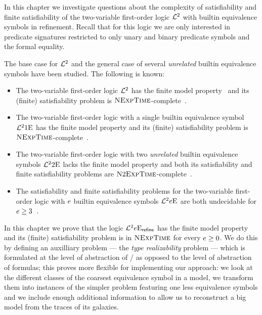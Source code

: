In this chapter we investigate questions about the complexity of satisfiability
and finite satisfiability of the two-variable first-order logic $\mathcal{L}^{2}$ with
builtin equivalence symbols in refinement. Recall that for this logic we are
only interested in predicate signatures restricted to only unary and binary
predicate symbols and the formal equality.

The base case for $\mathcal{L}^{2}$ and the general case of several \emph{unrelated}
builtin equivalence symbols have been studied. The following is known:
\begin{itemize}
  \item The two-variable first-order logic $\mathcal{L}^{2}$ has the finite model
  property~\cite{MALQ:MALQ19750210118} and its (finite) satisfiability problem
  is $\text{\normalfont{\scshape NExpTime}}$-complete~\cite{gradel1997decision}.
  \item The two-variable first-order logic with a single builtin equivalence
  symbol $\mathcal{L}^{2}{1}\mathrm{E}_{{}}$ has the finite model property and its (finite)
  satisfiability problem is $\text{\normalfont{\scshape NExpTime}}$-complete~\cite{kieronski2005results}.
  \item The two-variable first-order logic with two \emph{unrelated} builtin
  equivalence symbols $\mathcal{L}^{2}{2}\mathrm{E}_{{}}$ lacks the finite model property and both
  its satisfiability and finite satisfiability problems are
  $\text{\normalfont{\scshape N}}2\text{\normalfont{\scshape ExpTime}}$-complete~\cite{doi:10.1137/120900095}.
  \item The satisfiability and finite satisfiability problems for
  the two-variable first-order logic with $e$ builtin equivalence symbols
  $\mathcal{L}^{2}{e}\mathrm{E}_{{}}$ are both undecidable for $e \geq
  3$~\cite{kieronski2005small}.
\end{itemize}

In this chapter we prove that the logic $\mathcal{L}^{2}{e}\mathrm{E}_{\mathsf{refine}}$ has the finite
model property and its (finite) satisfiability problem is in $\text{\normalfont{\scshape NExpTime}}$ for
every $e \geq 0$.
We do this by defining an auxilliary problem --- the \emph{type realizability}
problem --- which is formulated at the level of abstraction of \twotypes/ as
opposed to the level of abstraction of formulas; this proves more flexible for
implementing our approach: we look at the different classes of the coarsest
equivalence symbol in a model, we transform them into instances of the simpler
problem featuring one less equivalence symbols and we include enough additional
information to allow us to reconstruct a big model from the traces of its
galaxies.